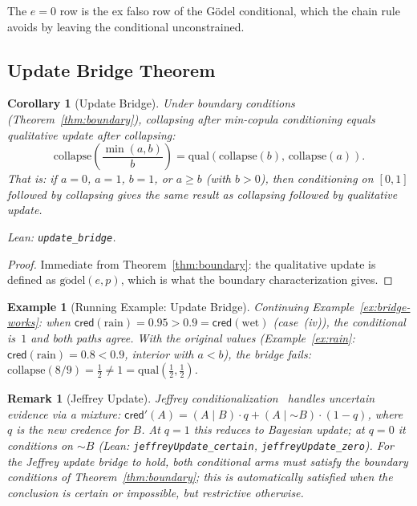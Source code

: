 \documentclass[11pt,a4paper]{article}
\newtheorem{corollary}[theorem]{Corollary}
\newtheorem{example}[theorem]{Example}
\newtheorem{remark}[theorem]{Remark}
\newcommand{\cred}{\mathsf{cred}}
\newcommand{\negc}{\mathord{\sim}}
\newcommand{\condc}[2]{({#1} \mid {#2})}
\begin{document}
The $e = 0$ row is the ex falso row of the G\"odel conditional,
which the chain rule avoids by leaving the conditional unconstrained.

\subsection{Update Bridge Theorem}

\begin{corollary}[Update Bridge]
\label{thm:update-bridge}
Under boundary conditions (Theorem~\ref{thm:boundary}), collapsing
after min-copula conditioning equals qualitative update after
collapsing:
\[
\mathrm{collapse}\!\left(\frac{\min(a,b)}{b}\right)
= \mathrm{qual}(\mathrm{collapse}(b),\, \mathrm{collapse}(a)).
\]
That is: if $a = 0$, $a = 1$, $b = 1$, or $a \geq b$ (with
$b > 0$), then conditioning on $[0,1]$ followed by collapsing
gives the same result as collapsing followed by qualitative update.

\smallskip\noindent
Lean: \texttt{update\_bridge}.
\end{corollary}

\begin{proof}
Immediate from Theorem~\ref{thm:boundary}: the qualitative update
is defined as $\mathrm{g\ddot{o}del}(e, p)$, which is what the
boundary characterization gives.
\end{proof}

\begin{example}[Running Example: Update Bridge]
\label{ex:update-bridge}
Continuing Example~\ref{ex:bridge-works}: when
$\cred(\text{rain}) = 0.95 > 0.9 = \cred(\text{wet})$
(case~(iv)), the conditional is~$1$ and both paths agree.
With the original values (Example~\ref{ex:rain}:
$\cred(\text{rain}) = 0.8 < 0.9$, interior with $a < b$),
the bridge fails:
$\mathrm{collapse}(8/9) = \tfrac{1}{2} \neq 1 =
\mathrm{qual}(\tfrac{1}{2}, \tfrac{1}{2})$.
\end{example}

\begin{remark}[Jeffrey Update]
\label{def:jeffrey}
Jeffrey conditionalization~\cite{jeffrey1965} handles uncertain
evidence via a mixture:
$\cred'(A) = \condc{A}{B} \cdot q + \condc{A}{\negc B} \cdot (1-q)$,
where $q$ is the new credence for $B$.
At $q = 1$ this reduces to Bayesian update; at $q = 0$ it conditions
on $\negc B$
(Lean: \texttt{jeffreyUpdate\_certain},
\texttt{jeffreyUpdate\_zero}).
For the Jeffrey update bridge to hold, both conditional arms must
satisfy the boundary conditions of Theorem~\ref{thm:boundary};
this is automatically satisfied when the conclusion is certain or
impossible, but restrictive otherwise.
\end{remark}
\end{document}
